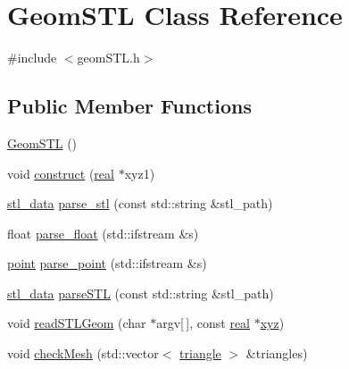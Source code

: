 \hypertarget{classGeomSTL}{}\section{Geom\+S\+TL Class Reference}
\label{classGeomSTL}


{\ttfamily \#include $<$geom\+S\+T\+L.\+h$>$}

\subsection*{Public Member Functions}
\begin{DoxyCompactItemize}
\item 
\mbox{\hyperlink{classGeomSTL_a90b2b4613d18ae27f53393233b063207}{Geom\+S\+TL}} ()
\item 
void \mbox{\hyperlink{classGeomSTL_abda226b5dab2871a7b61bfaf2203234d}{construct}} (\mbox{\hyperlink{definitions_8h_aedc0ad84d1e764530814f57ad931d02a}{real}} $\ast$xyz1)
\item 
\mbox{\hyperlink{structstl__data}{stl\+\_\+data}} \mbox{\hyperlink{classGeomSTL_ab73af5ba40ffa45cbff467fc6421088c}{parse\+\_\+stl}} (const std\+::string \&stl\+\_\+path)
\item 
float \mbox{\hyperlink{classGeomSTL_a4da4da9fdbd99722ca7e2005420a8e68}{parse\+\_\+float}} (std\+::ifstream \&s)
\item 
\mbox{\hyperlink{structpoint}{point}} \mbox{\hyperlink{classGeomSTL_a188d94b64201e5d2ee6ce8919742c240}{parse\+\_\+point}} (std\+::ifstream \&s)
\item 
\mbox{\hyperlink{structstl__data}{stl\+\_\+data}} \mbox{\hyperlink{classGeomSTL_a4dd58852b67375603db2735f4ab119ce}{parse\+S\+TL}} (const std\+::string \&stl\+\_\+path)
\item 
void \mbox{\hyperlink{classGeomSTL_aeccef8dc47681bd8b594bdcf93fdf910}{read\+S\+T\+L\+Geom}} (char $\ast$argv\mbox{[}$\,$\mbox{]}, const \mbox{\hyperlink{definitions_8h_aedc0ad84d1e764530814f57ad931d02a}{real}} $\ast$\mbox{\hyperlink{classGeomSTL_a38716d8c3db44ebc059e020d2ce926b2}{xyz}})
\item 
void \mbox{\hyperlink{classGeomSTL_a55768801abe34a2326c1a5013924faac}{check\+Mesh}} (std\+::vector$<$ \mbox{\hyperlink{structtriangle}{triangle}} $>$ \&triangles)
\end{DoxyCompactItemize}
